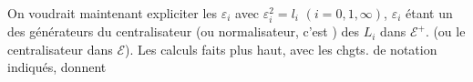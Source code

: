 On voudrait maintenant expliciter les $\varepsilon_i$ avec $\varepsilon_i^2=l_i$ $(i=0,1,\infty)$, $\varepsilon_i$ étant un des générateurs du centralisateur (ou normalisateur, c'est ) des $L_i$ dans $\mathcal E^+$. (ou le centralisateur dans $\mathcal E$). Les calculs faits plus haut, avec les chgts. de notation indiqués, donnent
\deleted{\[
(8)\quad\left\{\begin{aligned}
\varepsilon_0&=l_0^{\deleted{\unsure{-1}}}\sigma_1 l_{\unsure{1|0}}^{\deleted{\unsure{-1}}}\\
\varepsilon_1&=l_\infty^{-1}\sigma_\infty l_1^{-1}\\
\varepsilon_\infty&=l_0^{-1}\sigma_0 l_\infty^{\unsure{-1}}
\end{aligned}\right.
\]}
